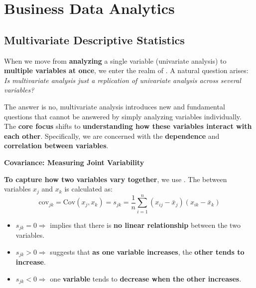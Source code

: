 \section{Business Data Analytics}

\subsection{Multivariate Descriptive Statistics}

When we move from \textbf{analyzing} a single variable (univariate analysis) to \textbf{multiple variables at once}, we enter the realm of . A natural question arises: \emph{Is multivariate analysis just a replication of univariate analysis across several variables?}

\highspace
The answer is no, multivariate analysis introduces new and fundamental questions that cannot be answered by simply analyzing variables individually. The \textbf{core focus} shifts to \textbf{understanding how these variables interact with each other}. Specifically, we are concerned with the \textbf{dependence} and \textbf{correlation between variables}.

\highspace
\begin{flushleft}
    \textcolor{Green3}{ \textbf{Covariance: Measuring Joint Variability}}
\end{flushleft}
\textbf{To capture how two variables vary together}, we use . The  between variables $ x_{j} $ and $ x_{k} $ is calculated as:
\begin{equation}
    \text{cov}_{jk} = \text{Cov}\left(x_{j}, x_{k}\right) = s_{jk} = \dfrac{1}{n} \displaystyle\sum_{i=1}^{n} (x_{ij} - \bar{x}_{j})(x_{ik} - \bar{x}_{k})
\end{equation}
\begin{itemize}
    \item $s_{jk} = 0 \Rightarrow$ implies that there is \textbf{no linear relationship} between the two variables.
    \item $s_{jk} > 0 \Rightarrow$ suggests that \textbf{as one variable increases}, the \textbf{other tends to increase}.
    \item $s_{jk} < 0 \Rightarrow$ one \textbf{variable} tends to \textbf{decrease when the other increases}.
\end{itemize}

